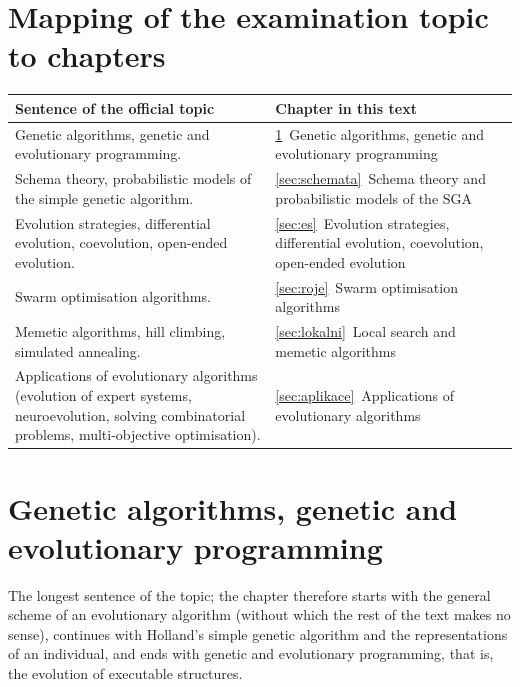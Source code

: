 \documentclass[11pt,a4paper]{article}
\theoremstyle{definition}
\begin{document}
\vspace{2mm}

\section*{Mapping of the examination topic to chapters}

\begin{center}
\small
\begin{tabular}{@{}>{\raggedright\arraybackslash}p{8.6cm}>{\raggedright\arraybackslash}p{7.4cm}@{}}
\toprule
\textbf{Sentence of the official topic} & \textbf{Chapter in this text} \\
\midrule
Genetic algorithms, genetic and evolutionary programming.
  & \ref{sec:ga}~Genetic algorithms, genetic and evolutionary programming \\
Schema theory, probabilistic models of the simple genetic algorithm.
  & \ref{sec:schemata}~Schema theory and probabilistic models of the SGA \\
Evolution strategies, differential evolution, coevolution, open-ended evolution.
  & \ref{sec:es}~Evolution strategies, differential evolution, coevolution, open-ended
    evolution \\
Swarm optimisation algorithms.
  & \ref{sec:roje}~Swarm optimisation algorithms \\
Memetic algorithms, hill climbing, simulated annealing.
  & \ref{sec:lokalni}~Local search and memetic algorithms \\
Applications of evolutionary algorithms (evolution of expert systems, neuroevolution, solving
combinatorial problems, multi-objective optimisation).
  & \ref{sec:aplikace}~Applications of evolutionary algorithms \\
\bottomrule
\end{tabular}
\end{center}

\vspace{2mm}
\tableofcontents
\newpage

\section{Genetic algorithms, genetic and evolutionary programming}
\label{sec:ga}

The longest sentence of the topic; the chapter therefore starts with the general scheme of
an evolutionary algorithm (without which the rest of the text makes no sense), continues
with Holland's simple genetic algorithm and the representations of an individual, and ends
with genetic and evolutionary programming, that is, the evolution of executable structures.
\end{document}
